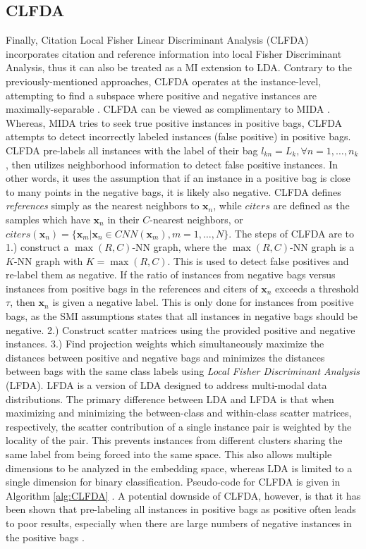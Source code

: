 \subsection{CLFDA} \label{sec:CLFDA}
Finally, Citation Local Fisher Linear Discriminant Analysis (CLFDA) \citep{Kim2010LocalDRMIL} incorporates citation and reference information into local Fisher Discriminant Analysis, thus it can also be treated as a MI extension to LDA.  Contrary to the previously-mentioned approaches, CLFDA operates at the instance-level, attempting to find a subspace where positive and negative instances are maximally-separable \citep{Latham2015MIFeatureRankingThesis}.  CLFDA can be viewed as complimentary to MIDA \citep{Chai2014MIDA}.  Whereas, MIDA tries to seek true positive instances in positive bags, CLFDA attempts to detect incorrectly labeled instances (false positive) in positive bags.  CLFDA pre-labels all instances with the label of their bag  $l_{kn} = L_{k}, \forall n = 1,\dots,n_{k}$, then utilizes neighborhood information to detect false positive instances.  In other words, it uses the assumption that if an instance in a positive bag is close to many points in the negative bags, it is likely also negative.  CLFDA defines \textit{references} simply as the nearest neighbors to $\bm{x}_{n}$, while $citers$ are defined as the samples which have $\bm{x}_{n}$ in their $C$-nearest neighbors, or $citers(\bm{x}_{n}) = \{ \bm{x}_{m}| \bm{x}_{n} \in CNN(\bm{x}_{m}), m=1, \dots, N \}$.   The steps of CLFDA are to 1.) construct a $\max(R,C)$-NN graph, where the $\max(R,C)$-NN graph is a $K$-NN graph with $K=\max(R,C)$.  This is used to detect false positives and re-label them as negative.  If the ratio of instances from negative bags versus instances from positive bags in the references and citers of $\bm{x}_n$ exceeds a threshold $\tau$, then $\bm{x}_{n}$ is given a negative label. This is only done for instances from positive bags, as the SMI assumptions states that all instances in negative bags should be negative. 2.) Construct scatter matrices using the provided positive and negative instances. 3.) Find projection weights which simultaneously maximize the distances between positive and negative bags and minimizes the distances between bags with the same class labels using \textit{Local Fisher Discriminant Analysis} (LFDA).  LFDA is a version of LDA  designed to address multi-modal data distributions.  The primary difference between LDA and LFDA is that when maximizing and minimizing the between-class and within-class scatter matrices, respectively, the scatter contribution of a single instance pair is weighted by the locality of the pair.  This prevents instances from different clusters sharing the same label from being forced into  the same space.  This also allows multiple dimensions to be analyzed in the embedding space, whereas LDA is limited to a single dimension for binary classification.  Pseudo-code for CLFDA is given in Algorithm \ref{alg:CLFDA} \citep{Latham2015MIFeatureRankingThesis}.  A potential downside of CLFDA, however, is that it has been shown that pre-labeling all instances in positive bags as positive often leads to poor results, especially when there are large numbers of negative instances in the positive bags \citep{Chai2014MIDA}.

